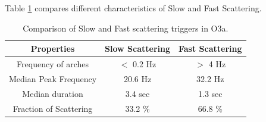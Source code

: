 \documentclass[12pt]{iopart}
\begin{document}
Table \ref{tab:fastslowtab} compares different characteristics of Slow and Fast Scattering.
\begin{table}[h]
    \centering
    \begin{tabular}{c|c|c}
    \hline
      \textbf{Properties}   &  \textbf{Slow Scattering} & 
      \textbf{Fast Scattering}\\
      \hline
       Frequency of arches  & $<$ 0.2 Hz & $>$ 4 Hz \\
      \hline
      Median Peak Frequency & 20.6 Hz & 32.2 Hz \\
      \hline
      Median duration & 3.4 sec & 1.3 sec \\
      \hline
      Fraction of Scattering & 33.2 \% & 66.8 \% \\
       
    \hline
    \end{tabular}
    \caption{Comparison of Slow and Fast scattering triggers in O3a.}
    \label{tab:fastslowtab}
\end{table}{}
\end{document}
